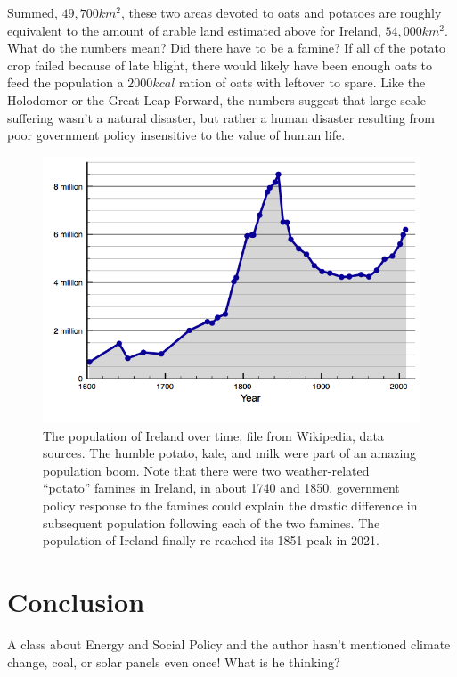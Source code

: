 \documentclass[prb,preprint]{revtex4-2}
\begin{document}
Summed, $49,700km^2$, these two areas devoted to oats and potatoes are roughly equivalent to the amount of arable land estimated above for Ireland, $54,000km^2$.\cite{arable_percentage}  
What do the numbers mean?  Did there have to be a famine?  If all of the potato crop failed because of late blight, there would likely have been enough oats to feed the population a $2000kcal$ ration of oats with leftover to spare.  
Like the Holodomor or the Great Leap Forward, the numbers suggest that large-scale suffering wasn't  a natural disaster, but rather a human disaster resulting from poor government policy insensitive to the value of human life.    



\begin{figure}[ht!]
\centering
\includegraphics[width=\columnwidth]{Population_of_Ireland_since_1600.png}
\caption{
The population of Ireland over time, file from Wikipedia,\cite{pop_image} data sources.\cite{pop_sources} 
The humble potato, kale, and milk were part of an amazing population boom.  Note that there were two weather-related ``potato'' famines in Ireland, in about 1740 and 1850.  government policy response to the famines could explain the drastic difference in subsequent population following each of the two famines.  The population of Ireland finally re-reached its 1851 peak in 2021.\cite{Ireland_5M}  
}
\label{ireland_population}
\end{figure}


\section{Conclusion}
A class about Energy and Social Policy and the author hasn't mentioned climate change, coal, or solar panels even once!  What is he thinking?  
\end{document}
